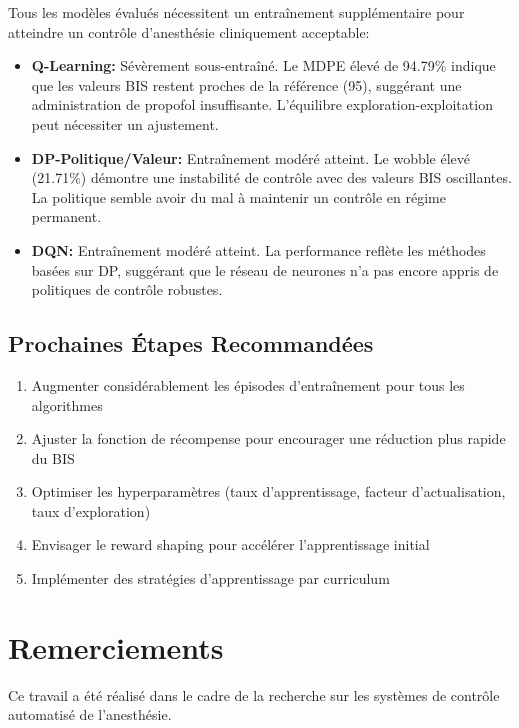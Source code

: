 \documentclass[12pt,a4paper]{article}
\begin{document}
Tous les modèles évalués nécessitent un entraînement supplémentaire pour atteindre un contrôle d'anesthésie cliniquement acceptable:

\begin{itemize}
    \item \textbf{Q-Learning:} Sévèrement sous-entraîné. Le MDPE élevé de 94.79\% indique que les valeurs BIS restent proches de la référence (95), suggérant une administration de propofol insuffisante. L'équilibre exploration-exploitation peut nécessiter un ajustement.
    
    \item \textbf{DP-Politique/Valeur:} Entraînement modéré atteint. Le wobble élevé (21.71\%) démontre une instabilité de contrôle avec des valeurs BIS oscillantes. La politique semble avoir du mal à maintenir un contrôle en régime permanent.
    
    \item \textbf{DQN:} Entraînement modéré atteint. La performance reflète les méthodes basées sur DP, suggérant que le réseau de neurones n'a pas encore appris de politiques de contrôle robustes.
\end{itemize}

\subsection{Prochaines Étapes Recommandées}

\begin{enumerate}
    \item Augmenter considérablement les épisodes d'entraînement pour tous les algorithmes
    \item Ajuster la fonction de récompense pour encourager une réduction plus rapide du BIS
    \item Optimiser les hyperparamètres (taux d'apprentissage, facteur d'actualisation, taux d'exploration)
    \item Envisager le reward shaping pour accélérer l'apprentissage initial
    \item Implémenter des stratégies d'apprentissage par curriculum
\end{enumerate}

\vfill

\section*{Remerciements}

Ce travail a été réalisé dans le cadre de la recherche sur les systèmes de contrôle automatisé de l'anesthésie.
\end{document}
